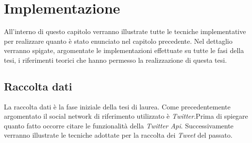 \chapter{Implementazione}
\label{capitolo5}
\thispagestyle{empty}
\begin{comment}
\begin{quotation}
{\footnotesize
\noindent \emph{``Terence: Ma scusa di che ti preoccupi, i piedipiatti hanno altro a cui pensare, in questo momento stanno cercando due cadaveri scomparsi \\
Bud: Se non spegni quella sirena uno di quei due cadaveri scomparsi lo trovano di sicuro!''}
\begin{flushright}
Nati con la camicia
\end{flushright}
}
\end{quotation}
\vspace{0.5cm}

\noindent Si mostra il progetto dell'architettura del sistema con i vari moduli.
\end{comment}

\noindent All'interno di questo capitolo verranno illustrate tutte le tecniche implementative per realizzare quanto è stato enunciato nel capitolo precedente. Nel dettaglio verranno spigate, argomentate le implementazioni effettuate su tutte le fasi della tesi, i riferimenti teorici che hanno permesso la realizzazione di questa tesi.
\section{Raccolta dati}
La raccolta dati è la fase iniziale della tesi di laurea. Come precedentemente argomentato il social network di riferimento utilizzato è \textit{Twitter}.Prima di spiegare quanto fatto occorre citare le funzionalità della \textit{Twitter Api}. Successivamente verranno illustrate le tecniche adottate per la raccolta dei \textit{Tweet} del passato.

